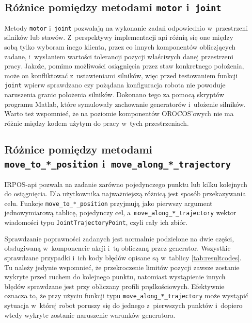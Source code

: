 \documentclass[a4paper, 12pt]{article}
\begin{document}
	\subsection{Różnice pomiędzy metodami \texttt{motor} i~\texttt{joint}}
	\label{sec:motjodiff}
	Metody \texttt{motor} i~\texttt{joint} pozwalają na wykonanie zadań odpowiednio w~przestrzeni silników lub stawów. Z~perspektywy implementacji api różnią się one  między sobą tylko wyboram inego klienta, przez co innych komponentów obliczjących zadane, i~wysłaniem wartości tolerancji pozycji właściwych danej przestrzeni pracy. Jakoże, pomimo możliwości osiągnięcia przez staw konkretnego położenia, może on konfliktować z~ustawieniami silników, więc przed testowaniem funkcji \texttt{joint} wpierw sprawdzano czy pożądana konfiguracja robota nie powoduje naruszenia granic położenia silników. Dokonano tego za pomocą skryptów programu Matlab, które symulowały zachowanie generatorów i~ułożenie silników. Warto też wspomnieć, że na poziomie komponentów OROCOS'owych nie ma różnic między kodem użytym do pracy w~tych przestrzeniach. 
	
	\subsection{Różnice pomiędzy metodami \texttt{move\_to\_*\_position}
	\linebreak i~\texttt{move\_along\_*\_trajectory}}
	 
	\label{sec:postradiff}
	IRPOS-api pozwala na zadanie zarówno pojedynczego punktu lub kilku kolejnych do osiągnięcia. Dla użytkownika najważniejszą różnicą jest sposób przekazywania celu. Funkcje \linebreak \texttt{move\_to\_*\_position} przyjmują jako pierwszy argument jednowymiarową tablicę, pojedynczy cel, a~\texttt{move\_along\_*\_trajectory} wektor wiadomości typu \texttt{JointTrajectoryPoint}, czyli cały ich zbiór. 
	\par Sprawdzanie poprawności zadanych jest normalnie podzielone na dwie części, obsługiwaną w~komponencie akcji i~tą obliczaną przez generator. Wszystkie sprawdzane przypadki i~ich kody błędów opisane są w~tablicy \ref{tab:resultcodes}. Tu należy jedynie wspomnieć, że przekroczenie limitów pozycji zawsze zostanie wykryte przed ruchem do kolejnego punktu, natomiast wystąpienie innych błędów sprawdzane jest przy obliczany profili prędkościowych. Efektywnie oznacza to, że przy użyciu funkcji typu \texttt{move\_along\_*\_trajectory} może wystąpić sytuacja w~której robot poruszy się do jednego z~pierwszych punktów i~dopiero wtedy wykryte zostanie naruszenie warunków generatora.
	
\end{document}
